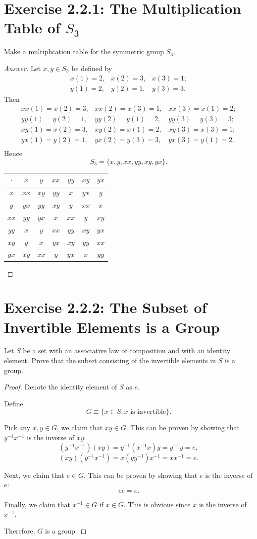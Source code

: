 \documentclass{amsbook}
\theoremstyle{definition}
\theoremstyle{remark}
\numberwithin{section}{chapter}
\numberwithin{equation}{chapter}
\begin{document}
\section{Exercise 2.2.1: The Multiplication Table of $S_3$}
Make a multiplication table for the symmetric group $S_3$.
\begin{proof}[Answer]
Let $x,y\in S_3$ be defined by\[
\begin{array}{ccc}
x(1)=2,&x(2)=3,&x(3)=1;\\
y(1)=2,&y(2)=1,&y(3)=3.
\end{array}
\]Then\[
\begin{array}{ccc}
xx(1)=x(2)=3,&xx(2)=x(3)=1,&xx(3)=x(1)=2;\\
yy(1)=y(2)=1,&yy(2)=y(1)=2,&yy(3)=y(3)=3;\\
xy(1)=x(2)=3,&xy(2)=x(1)=2,&xy(3)=x(3)=1;\\
yx(1)=y(2)=1,&yx(2)=y(3)=3,&yx(3)=y(1)=2.\\
\end{array}
\]Hence\[
S_3=\{x,y,xx,yy,xy,yx\}.
\]

\begin{table}[ht]
\centering
\begin{tabular}{c||c|c|c|c|c|c}
$\cdot$
& $x$
& $y$
& $xx$
& $yy$
& $xy$
& $yx$
\\\hline
\hline
$x$     
& $xx$
& $xy$
& $yy$
& $x$
& $yx$
& $y$
\\\hline
$y$ 
& $yx$
& $yy$
& $xy$
& $y$
& $xx$
& $x$
\\\hline
$xx$          
& $yy$
& $yx$
& $x$
& $xx$
& $y$
& $xy$
\\\hline
$yy$   
& $x$
& $y$
& $xx$
& $yy$
& $xy$
& $yx$
\\\hline
$xy$     
& $y$
& $x$
& $yx$
& $xy$
& $yy$
& $xx$
\\\hline
$yx$
& $xy$
& $xx$
& $y$
& $yx$
& $x$
& $yy$
\end{tabular}
\end{table}
\end{proof}

\section{Exercise 2.2.2: The Subset of Invertible Elements is a Group}
Let $S$ be a set with an associative law of composition and with an identity element. Prove that the subset consisting of the invertible elements in $S$ is a group.
\begin{proof}
Denote the identity element of $S$ as $e$.

Define\[
G\equiv\{x\in S: x\text{ is invertible}\}.
\]

Pick any $x,y\in G$, we claim that $xy\in G$. This can be proven by showing that $y^{-1}x^{-1}$ is the inverse of $xy$:\[
(y^{-1}x^{-1})(xy)=y^{-1}(x^{-1}x)y=y^{-1}y=e,
\]\[
(xy)(y^{-1}x^{-1})=x(yy^{-1})x^{-1}=xx^{-1}=e.
\]

Next, we claim that $e\in G$. This can be proven by showing that $e$ is the inverse of $e$:\[
ee=e.
\]

Finally, we claim that $x^{-1}\in G$ if $x\in G$. This is obvious since $x$ is the inverse of $x^{-1}$.

Therefore, $G$ is a group.
\end{proof}
\end{document}
